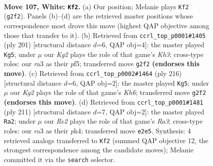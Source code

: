 \documentclass[11pt]{article}
\begin{document}
\begin{figure}[p]\centering
\begin{subfigure}{0.46\textwidth}\centering
\resizebox{\linewidth}{!}{%
\newchessgame
\chessboard[
  setfen={8/5k2/8/8/8/r7/4R1K1/2r5 w - - 24 107},
  showmover=false,
  pgfstyle=straightmove, color=movearrow, markmove={g2-f2}
]}
\caption{}
\end{subfigure}\hfill
\begin{subfigure}{0.46\textwidth}\centering
\resizebox{\linewidth}{!}{%
\newchessgame
\chessboard[
  setfen={8/4R3/5p1k/5P2/7r/5K2/8/8 b - - 15 101},
  showmover=false,
  pgfstyle=straightmove, color=movearrow, markmove={h6-g5}
]}
\caption{}
\end{subfigure}
\\[4pt]
\begin{subfigure}{0.46\textwidth}\centering
\resizebox{\linewidth}{!}{%
\newchessgame
\chessboard[
  setfen={8/r7/5N1K/5R2/8/8/6k1/2r5 w - - 58 109},
  showmover=false,
  pgfstyle=straightmove, color=movearrow, markmove={h6-g5}
]}
\caption{}
\end{subfigure}\hfill
\begin{subfigure}{0.46\textwidth}\centering
\resizebox{\linewidth}{!}{%
\newchessgame
\chessboard[
  setfen={5K2/8/r1k5/8/7P/6p1/8/4R3 b - - 19 106},
  showmover=false,
  pgfstyle=straightmove, color=movearrow, markmove={a6-a2}
]}
\caption{}
\end{subfigure}
\caption{\textbf{Move 107, White: \texttt{Kf2}.} (a) Our position; Melanie plays \texttt{Kf2} (\texttt{g2f2}). Panels (b)--(d) are the retrieved master positions whose correspondence most drove this move (highest QAP objective among those that transfer to it). (b) Retrieved from \texttt{ccrl\_top\_p0001\#1405} (ply 201) [structural distance $d$=6, QAP obj=4]: the master played \texttt{Kg5}; under $\mu$ our \emph{Kg2} plays the role of that game's \emph{Kh3}; cross-type roles: our \emph{r}a3 as their \emph{p}f5; transferred move \texttt{g2f2} \textbf{(endorses this move)}. (c) Retrieved from \texttt{ccrl\_top\_p0002\#1464} (ply 216) [structural distance $d$=6, QAP obj=2]: the master played \texttt{Kg5}; under $\mu$ our \emph{Kg2} plays the role of that game's \emph{Kh6}; transferred move \texttt{g2f2} \textbf{(endorses this move)}. (d) Retrieved from \texttt{ccrl\_top\_p0001\#1481} (ply 211) [structural distance $d$=7, QAP obj=2]: the master played \texttt{Ra2}; under $\mu$ our \emph{Re2} plays the role of that game's \emph{Ra3}; cross-type roles: our \emph{r}a3 as their \emph{p}h4; transferred move \texttt{e2e5}. Synthesis: 4 retrieved analogs transferred to \texttt{Kf2} (summed QAP objective 12, the strongest correspondence among the candidate moves); Melanie committed it via the \texttt{search} selector.}
\label{fig:thought-m212}
\end{figure}
\end{document}
